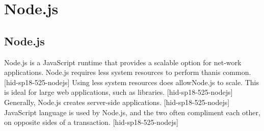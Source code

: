 \section{Node.js}


\subsection{Node.js}

Node.js is a JavaScript runtime that provides a scalable 
option for net-work applications. Node.js requires less 
system resources to perform thanis common. 
[hid-sp18-525-nodejs] Using less system resources does 
allowNode.js to scale. This is ideal for large web 
applications, such as libraries. [hid-sp18-525-nodejs] 
Generally, Node.js creates server-side applications. 
[hid-sp18-525-nodejs] JavaScript language is used by 
Node.js, and the two often compliment each
other, on opposite sides of a transaction. 
[hid-sp18-525-nodejs]
